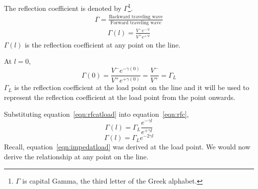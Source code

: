 The reflection coefficient is denoted by $\Gamma$\footnote{
$\Gamma$ is capital Gamma, the third letter of the Greek alphabet.
}.
\begin{align*}
\Gamma = \frac{\text{Backward traveling wave}}{\text{Forward traveling wave}}
\end{align*}
\begin{align}
\Gamma(l) = \frac{V^-e^{-\gamma l}}{V^+e^{+\gamma l}}
\label{eqn:rfc}
\end{align}
$\Gamma(l)$ is the reflection coefficient at any point on the line.

At $l = 0$,
\begin{dmath}
\Gamma (0) = \frac{V^-e^{-\gamma (0)}}{V^+e^{+\gamma (0)}}
= \frac{V^-}{V^+}
= \Gamma_L
\label{eqn:rfcatload}
\end{dmath}
$\Gamma_L$ is the reflection coefficient at the load point on the line and it will be used to represent the reflection coefficient at the load point from the point onwards.

Substituting equation~\eqref{eqn:rfcatload} into equation~\eqref{eqn:rfc},
\begin{equation*}
\Gamma (l) = \Gamma_L\frac{e^{-\gamma l}}{e^{+\gamma l}}
\end{equation*}
\begin{equation}
\Gamma (l) = \Gamma_L e^{-2\gamma l}
\label{eqn:rfc2}
\end{equation}
Recall, equation~\ref{eqn:impedatload} was derived at the load point. We would now derive the relationship at any point on the line.

